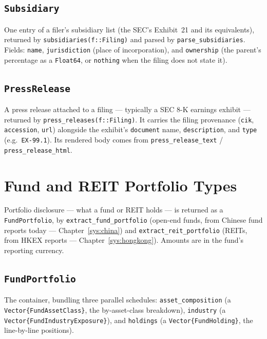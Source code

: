 \documentclass[11pt,a4paper]{report}
\begin{document}
\subsection{\texttt{Subsidiary}}
\label{sec:api-subsidiary}

\noindent One entry of a filer's subsidiary list (the SEC's Exhibit~21 and its equivalents), returned by
\texttt{subsidiaries(f::Filing)} and parsed by \texttt{parse\_subsidiaries}. Fields: \texttt{name},
\texttt{jurisdiction} (place of incorporation), and \texttt{ownership} (the parent's percentage as a
\texttt{Float64}, or \texttt{nothing} when the filing does not state it).

\subsection{\texttt{PressRelease}}
\label{sec:api-pressrelease}

\noindent A press release attached to a filing --- typically a SEC 8-K earnings exhibit --- returned by
\texttt{press\_releases(f::Filing)}. It carries the filing provenance (\texttt{cik}, \texttt{accession},
\texttt{url}) alongside the exhibit's \texttt{document} name, \texttt{description}, and \texttt{type} (e.g.\
\texttt{EX-99.1}). Its rendered body comes from \texttt{press\_release\_text} / \texttt{press\_release\_html}.

\section{Fund and REIT Portfolio Types}
\label{sec:api-portfolio-types}

\noindent Portfolio disclosure --- what a fund or REIT holds --- is returned as a \texttt{FundPortfolio}, by
\texttt{extract\_fund\_portfolio} (open-end funds, from Chinese fund reports today --- Chapter~\ref{sys:china})
and \texttt{extract\_reit\_portfolio} (REITs, from HKEX reports --- Chapter~\ref{sys:hongkong}). Amounts are in
the fund's reporting currency.

\subsection{\texttt{FundPortfolio}}
\label{sec:api-fundportfolio}

\noindent The container, bundling three parallel schedules: \texttt{asset\_composition} (a
\texttt{Vector\{FundAssetClass\}}, the by-asset-class breakdown), \texttt{industry} (a
\texttt{Vector\{FundIndustryExposure\}}), and \texttt{holdings} (a \texttt{Vector\{FundHolding\}}, the
line-by-line positions).
\end{document}
